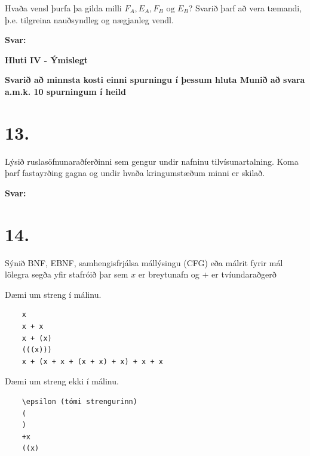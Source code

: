 \documentclass{article}
\newcommand{\sv}{\textbf{Svar:}}
\newcommand{\bo}[1]{\textbf{#1}}
\begin{document}
 Hvaða vensl þurfa þa gilda milli $F_A, E_A, F_B \text{ og } E_B$? Svarið þarf að
 vera tæmandi, þ.e. tilgreina nauðsyndleg og nægjanleg vendl.

 \sv

 \newpage

 \begin{center}
    \bo{Hluti IV - Ýmislegt}


    \bo{Svarið að minnsta kosti einni spurningu í þessum hluta 
    Munið að svara a.m.k. 10 spurningum í heild}
 \end{center}

 \section{13.}
 Lýsið ruslasöfnunaraðferðinni sem gengur undir nafninu 
 tilvísunartalning. Koma þarf fastayrðing gagna og undir hvaða 
 kringumstæðum minni er skilað.


 \sv

 \newpage
 \section{14.}
 Sýnið BNF, EBNF, samhengisfrjálsa mállýsingu (CFG) eða málrit
 fyrir mál lölegra segða yfir stafróið  þar sem $x$ er
 breytunafn og $+$ er tvíundaraðgerð

 Dæmi um streng í málinu.
 \begin{verbatim}
    x
    x + x
    x + (x)
    (((x)))
    x + (x + x + (x + x) + x) + x + x
 \end{verbatim}
 
 Dæmi um streng ekki í málinu.

\begin{verbatim}
    \epsilon (tómi strengurinn)
    (
    )
    +x
    ((x)
 \end{verbatim}
\end{document}
